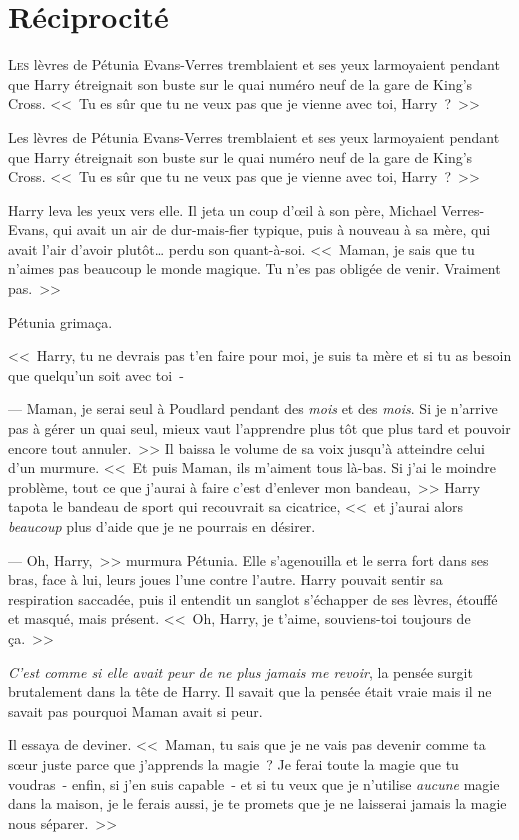 \chapter{Réciprocité}

\lettrine{L}{es} lèvres de Pétunia Evans-Verres tremblaient et ses yeux larmoyaient pendant que Harry étreignait son buste sur le quai numéro neuf de la gare de King's Cross. <<~Tu es sûr que tu ne veux pas que je vienne avec toi, Harry~?~>>

Les lèvres de Pétunia Evans-Verres tremblaient et ses yeux larmoyaient pendant que Harry étreignait son buste sur le quai numéro neuf de la gare de King's Cross. <<~Tu es sûr que tu ne veux pas que je vienne avec toi, Harry~?~>>

Harry leva les yeux vers elle. Il jeta un coup d'œil à son père, Michael Verres-Evans, qui avait un air de dur-mais-fier typique, puis à nouveau à sa mère, qui avait l'air d'avoir plutôt… perdu son quant-à-soi. <<~Maman, je sais que tu n'aimes pas beaucoup le monde magique. Tu n'es pas obligée de venir. Vraiment pas.~>>

Pétunia grimaça.

<<~Harry, tu ne devrais pas t'en faire pour moi, je suis ta mère et si tu as besoin que quelqu'un soit avec toi~-

--- Maman, je serai seul à Poudlard pendant des \emph{mois} et des \emph{mois}. Si je n'arrive pas à gérer un quai seul, mieux vaut l'apprendre plus tôt que plus tard et pouvoir encore tout annuler.~>> Il baissa le volume de sa voix jusqu'à atteindre celui d'un murmure. <<~Et puis Maman, ils m'aiment tous là-bas. Si j'ai le moindre problème, tout ce que j'aurai à faire c'est d'enlever mon bandeau,~>> Harry tapota le bandeau de sport qui recouvrait sa cicatrice, <<~et j'aurai alors \emph{beaucoup} plus d'aide que je ne pourrais en désirer.

--- Oh, Harry,~>> murmura Pétunia. Elle s'agenouilla et le serra fort dans ses bras, face à lui, leurs joues l'une contre l'autre. Harry pouvait sentir sa respiration saccadée, puis il entendit un sanglot s'échapper de ses lèvres, étouffé et masqué, mais présent. <<~Oh, Harry, je t'aime, souviens-toi toujours de ça.~>>

\emph{C'est comme si elle avait peur de ne plus jamais me revoir}, la pensée surgit brutalement dans la tête de Harry. Il savait que la pensée était vraie mais il ne savait pas pourquoi Maman avait si peur.

Il essaya de deviner. <<~Maman, tu sais que je ne vais pas devenir comme ta sœur juste parce que j'apprends la magie~? Je ferai toute la magie que tu voudras~- enfin, si j'en suis capable~- et si tu veux que je n'utilise \emph{aucune} magie dans la maison, je le ferais aussi, je te promets que je ne laisserai jamais la magie nous séparer.~>>


